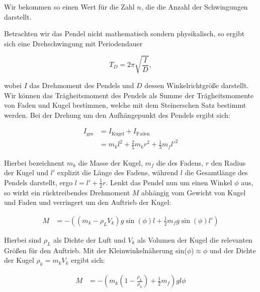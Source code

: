 \documentclass{article}
\begin{document}
Wir bekommen so einen Wert für die Zahl $n$, die die Anzahl der Schwingungen darstellt. 

Betrachten wir das Pendel nicht mathematisch sondern physikalisch, so ergibt sich eine Drehschwingung mit Periodendauer

\begin{equation}
    T_D = 2\pi \sqrt{\frac{I}{D}},
    \label{eq:3}
\end{equation}

wobei $I$ das Drehmoment des Pendels und $D$ dessen Winkelrichtgröße darstellt. Wir können das Trägheitsmoment des Pendels als Summe der Trägheitsmomente von Faden und Kugel bestimmen, welche mit dem Steinerschen Satz bestimmt werden. Bei der Drehung um den Aufhängepunkt des Pendels ergibt sich:

\begin{equation}
    \begin{split}
        I_{\text{ges}} &= I_{\text{Kugel}} + I_{\text{Faden}} \\
        &= m_kl^2 + \frac{2}{5}m_k r^2 + \frac{1}{3}m_f l'^2
    \end{split}
    \label{eq:4}
\end{equation}

Hierbei bezeichnent $m_k$ die Masse der Kugel, $m_f$ die des Fadens, $r$ den Radius der Kugel und $l'$ explizit die Länge des Fadens, während $l$ die Gesamtlänge des Pendels darstellt, ergo $l=l'+\frac{1}{2}r$. Lenkt das Pendel nun um einen Winkel $\phi$ aus, so wirkt ein rücktreibendes Drehmoment $M$ abhängig vom Gewicht von Kugel und Faden und verringert um den Auftrieb der Kugel:

\begin{equation}
    \begin{split}
        M &= - \left( (m_k-\rho_L V_k)g \sin{(\phi)l + \frac{1}{2} m_fg \sin{(\phi)}l'} \right)
    \end{split}
    \label{eq:5}
\end{equation}

Hierbei sind $\rho_L$ als Dichte der Luft und $V_k$ als Volumen der Kugel die relevanten Größen für den Auftrieb. Mit der Kleinwinkelnäherung sin($\phi$)$\approx \phi$ und der Dichte der Kugel $\rho_k =m_kV_k$ ergibt sich:

\begin{equation}
    \begin{split}
        M &= - \left( m_k \left( 1 - \frac{\rho_L}{\rho_k} \right) + \frac{1}{2} m_f \right) gl \phi
    \end{split}
    \label{eq:6}
\end{equation}
\end{document}
